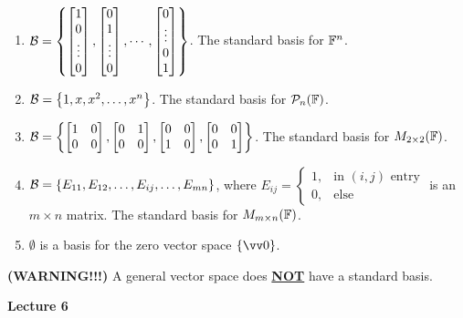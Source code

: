 \begin{example}
    \phantom{}
    \begin{enumerate}
        \item $\mathcal{B} = \left\{  \begin{bmatrix} 1 \\ 0 \\ \vdots \\ 0 \end{bmatrix}, \begin{bmatrix} 0 \\ 1 \\ \vdots \\ 0 \end{bmatrix}, \cdots, \begin{bmatrix} 0 \\ \vdots \\ 0 \\1 \end{bmatrix} \right\}$.
        The standard basis for ${\mathbb{F}}^n$.
        \item $\mathcal{B} = \left\{  1, x, x^2, \ldots, x^n \right\}$. The standard basis for $\mathcal{P}_n({\mathbb{F}})$.
        \item $\mathcal{B} = \left\{  \begin{bmatrix} 1 & 0 \\ 0 & 0 \end{bmatrix}, \begin{bmatrix} 0 & 1 \\ 0 & 0 \end{bmatrix}, \begin{bmatrix} 0 & 0 \\ 1 & 0 \end{bmatrix}, \begin{bmatrix} 0 & 0 \\ 0 & 1 \end{bmatrix} \right\}$.
        The standard basis for $M_{2 \times 2}({\mathbb{F}})$.
        \item $\mathcal{B} = \left\{  E_{11}, E_{12}, \ldots, E_{ij}, \ldots, E_{mn} \right\}$, where $E_{ij} = 
        \begin{cases}
            1, &\text{in $(i, j)$ entry} \\
            0, &\text{else}
        \end{cases}$ is an $m \times n$ matrix. The standard basis for $M_{m \times n}({\mathbb{F}})$.
        \item $\emptyset$ is a basis for the zero vector space $\{\vzero\}$.
    \end{enumerate}
\end{example}

\begin{remark}\textbf{(WARNING!!!)}
    \phantom{}
    A general vector space does \textbf{\underline{NOT}} have a standard basis.
\end{remark}

\makebox[\linewidth]{\hrulefill}
{\large \textbf{Lecture 6}}

